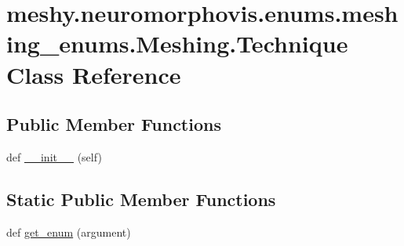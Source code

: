 \hypertarget{classmeshy_1_1neuromorphovis_1_1enums_1_1meshing__enums_1_1Meshing_1_1Technique}{}\section{meshy.\+neuromorphovis.\+enums.\+meshing\+\_\+enums.\+Meshing.\+Technique Class Reference}
\label{classmeshy_1_1neuromorphovis_1_1enums_1_1meshing__enums_1_1Meshing_1_1Technique}


 


\subsection*{Public Member Functions}
\begin{DoxyCompactItemize}
\item 
def \hyperlink{classmeshy_1_1neuromorphovis_1_1enums_1_1meshing__enums_1_1Meshing_1_1Technique_a3b204ffb14f0d07d6be6f204aa126c6c}{\+\_\+\+\_\+init\+\_\+\+\_\+} (self)\hypertarget{classmeshy_1_1neuromorphovis_1_1enums_1_1meshing__enums_1_1Meshing_1_1Technique_a3b204ffb14f0d07d6be6f204aa126c6c}{}\label{classmeshy_1_1neuromorphovis_1_1enums_1_1meshing__enums_1_1Meshing_1_1Technique_a3b204ffb14f0d07d6be6f204aa126c6c}

\end{DoxyCompactItemize}
\subsection*{Static Public Member Functions}
\begin{DoxyCompactItemize}
\item 
def \hyperlink{classmeshy_1_1neuromorphovis_1_1enums_1_1meshing__enums_1_1Meshing_1_1Technique_a85d8ae2725726a0b1c80a3cb4f714233}{get\+\_\+enum} (argument)\hypertarget{classmeshy_1_1neuromorphovis_1_1enums_1_1meshing__enums_1_1Meshing_1_1Technique_a85d8ae2725726a0b1c80a3cb4f714233}{}\label{classmeshy_1_1neuromorphovis_1_1enums_1_1meshing__enums_1_1Meshing_1_1Technique_a85d8ae2725726a0b1c80a3cb4f714233}

\end{DoxyCompactItemize}
